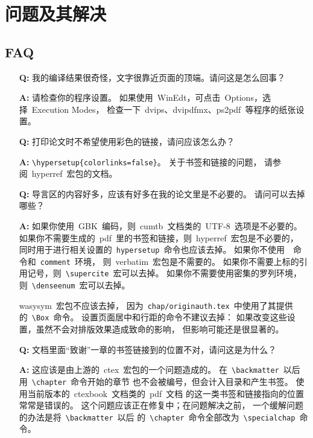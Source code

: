 \chapter{问题及其解决}
	\section{FAQ\label{sec:faq}}
	\begin{enumerate}
		\item[\textbf{Q:}]
		我的编译结果很奇怪，文字很靠近页面的顶端。请问这是怎么回事？

		\item[\textbf{A:}]
		请检查你的程序设置。
		如果使用~WinEdt，可点击~Options，选择~Execution Modes，
		检查一下~dvips、dvipdfmx、ps2pdf~等程序的纸张设置。

		\item[\textbf{Q:}]
		打印论文时不希望使用彩色的链接，请问应该怎么办？

		\item[\textbf{A:}]
		\verb|\hypersetup{colorlinks=false}|。
		关于书签和链接的问题，
		请参阅~hyperref~宏包的文档\supercite{hyperref-doc}。

		\item[\textbf{Q:}]
		导言区的内容好多，应该有好多在我的论文里是不必要的。
		请问可以去掉哪些？

		\item[\textbf{A:}]
		如果你使用~GBK~编码，则~cumtb~文档类的~UTF-8~选项是不必要的。
		如果你不需要生成的~pdf~里的书签和链接，则~hyperref~宏包是不必要的，
		同时用于进行相关设置的~\verb|hypersetup|~命令也应该去掉。
		如果你不使用~\verb||~命令和~\verb|comment|~环境，
		则~verbatim~宏包是不需要的。
		如果你不需要上标的引用记号，则~\verb|\supercite|~宏可以去掉。
		如果你不需要使用密集的罗列环境，则~\verb|\denseenum|~宏可以去掉。

		wasysym~宏包不应该去掉，
		因为~\verb|chap/originauth.tex|~中使用了其提供的~\verb|\Box|~命令。
		设置页面居中和行距的命令不建议去掉：
		如果改变这些设置，虽然不会对排版效果造成致命的影响，
		但影响可能还是很显著的。

		\item[\textbf{Q:}]
		文档里面“致谢”一章的书签链接到的位置不对，请问这是为什么？

		\item[\textbf{A:}]
		这应该是由上游的~ctex~宏包的一个问题造成的。
		在~\verb|\backmatter|~以后用~\verb|\chapter|~命令开始的章节%
		也不会被编号，但会计入目录和产生书签。
		使用当前版本的~ctexbook~文档类的~pdf~文档%
		的这一类书签和链接指向的位置常常是错误的。
		这个问题应该正在修复中；在问题解决之前，
		一个缓解问题的办法是将~\verb|\backmatter|~以后%
		的~\verb|\chapter|~命令全部改为~\verb|\specialchap|~命令。
	\end{enumerate}

